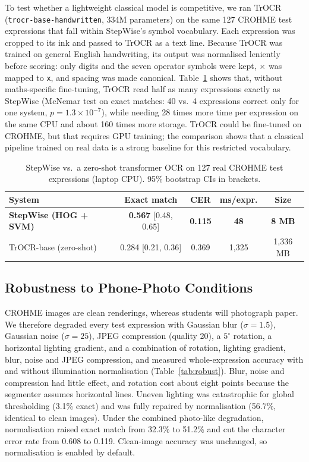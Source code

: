 \documentclass[runningheads]{llncs}
\begin{document}
To test whether a lightweight classical model is competitive, we ran TrOCR~\cite{li2023trocr} (\texttt{trocr-base-handwritten}, 334M parameters) on the same 127 CROHME test expressions that fall within StepWise's symbol vocabulary. Each expression was cropped to its ink and passed to TrOCR as a text line. Because TrOCR was trained on general English handwriting, its output was normalised leniently before scoring: only digits and the seven operator symbols were kept, $\times$ was mapped to \texttt{x}, and spacing was made canonical. Table~\ref{tab:dl} shows that, without maths-specific fine-tuning, TrOCR read half as many expressions exactly as StepWise (McNemar test on exact matches: 40 vs.\ 4 expressions correct only for one system, $p=1.3\times10^{-7}$), while needing 28 times more time per expression on the same CPU and about 160 times more storage. TrOCR could be fine-tuned on CROHME, but that requires GPU training; the comparison shows that a classical pipeline trained on real data is a strong baseline for this restricted vocabulary.

\begin{table}[t]
\caption{StepWise vs.\ a zero-shot transformer OCR on 127 real CROHME test expressions (laptop CPU). 95\% bootstrap CIs in brackets.}\label{tab:dl}
\centering\small
\begin{tabular}{@{}lcccc@{}}
\toprule
System & Exact match & CER & ms/expr. & Size \\
\midrule
\textbf{StepWise (HOG + SVM)} & \textbf{0.567} [0.48, 0.65] & \textbf{0.115} & \textbf{48} & \textbf{8 MB} \\
TrOCR-base (zero-shot) & 0.284 [0.21, 0.36] & 0.369 & 1,325 & 1,336 MB \\
\bottomrule
\end{tabular}
\end{table}

\subsection{Robustness to Phone-Photo Conditions}

CROHME images are clean renderings, whereas students will photograph paper. We therefore degraded every test expression with Gaussian blur ($\sigma=1.5$), Gaussian noise ($\sigma=25$), JPEG compression (quality 20), a $5^\circ$ rotation, a horizontal lighting gradient, and a combination of rotation, lighting gradient, blur, noise and JPEG compression, and measured whole-expression accuracy with and without illumination normalisation (Table~\ref{tab:robust}). Blur, noise and compression had little effect, and rotation cost about eight points because the segmenter assumes horizontal lines. Uneven lighting was catastrophic for global thresholding (3.1\% exact) and was fully repaired by normalisation (56.7\%, identical to clean images). Under the combined photo-like degradation, normalisation raised exact match from 32.3\% to 51.2\% and cut the character error rate from 0.608 to 0.119. Clean-image accuracy was unchanged, so normalisation is enabled by default.
\end{document}
